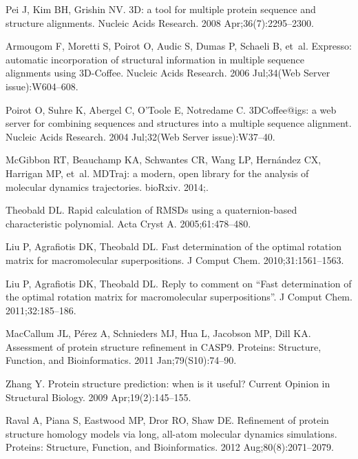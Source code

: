 \documentclass[10pt,letterpaper]{article}
\begin{document}
\begin{thebibliography}{100}
Pei J, Kim BH, Grishin NV.
3D: a tool for multiple protein sequence and structure
  alignments.
\newblock Nucleic Acids Research. 2008 Apr;36(7):2295--2300.

Armougom F, Moretti S, Poirot O, Audic S, Dumas P, Schaeli B, et~al.
\newblock Expresso: automatic incorporation of structural information in
  multiple sequence alignments using 3D-{Coffee}.
\newblock Nucleic Acids Research. 2006 Jul;34(Web Server issue):W604--608.

Poirot O, Suhre K, Abergel C, O'Toole E, Notredame C.
\newblock 3DCoffee@igs: a web server for combining sequences and structures
  into a multiple sequence alignment.
\newblock Nucleic Acids Research. 2004 Jul;32(Web Server issue):W37--40.

McGibbon RT, Beauchamp KA, Schwantes CR, Wang LP, Hern{\'a}ndez CX, Harrigan
  MP, et~al.
\newblock MDTraj: a modern, open library for the analysis of molecular dynamics
  trajectories.
\newblock bioRxiv. 2014;.

Theobald DL.
\newblock Rapid calculation of {RMSDs} using a quaternion-based characteristic
  polynomial.
\newblock Acta Cryst A. 2005;61:478--480.

Liu P, Agrafiotis DK, Theobald DL.
\newblock Fast determination of the optimal rotation matrix for macromolecular
  superpositions.
\newblock J Comput Chem. 2010;31:1561--1563.

Liu P, Agrafiotis DK, Theobald DL.
\newblock Reply to comment on ``Fast determination of the optimal rotation
  matrix for macromolecular superpositions''.
\newblock J Comput Chem. 2011;32:185--186.

MacCallum JL, P{\'e}rez A, Schnieders MJ, Hua L, Jacobson MP, Dill KA.
\newblock Assessment of protein structure refinement in {CASP}9.
\newblock Proteins: Structure, Function, and Bioinformatics. 2011
  Jan;79(S10):74--90.

Zhang Y.
\newblock Protein structure prediction: when is it useful?
\newblock Current Opinion in Structural Biology. 2009 Apr;19(2):145--155.

Raval A, Piana S, Eastwood MP, Dror RO, Shaw DE.
\newblock Refinement of protein structure homology models via long, all-atom
  molecular dynamics simulations.
\newblock Proteins: Structure, Function, and Bioinformatics. 2012
  Aug;80(8):2071--2079.


\end{thebibliography}
\end{document}
